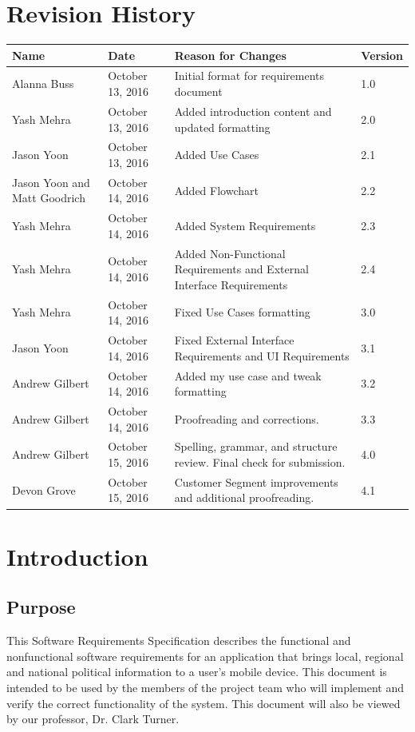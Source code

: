 \documentclass[12pt,oneside,letterpaper]{article}
\newcounter{use_case}
\newcounter{functional_requirement}
\begin{document}
\section*{Revision History}
\begin{tabu}{|X[L.5]|l|X|l|}
  \hline
  \textbf{Name}&\textbf{Date}&\textbf{Reason for Changes}&\textbf{Version} \\
  \hline
  Alanna Buss & October 13, 2016 & Initial format for requirements document & 1.0 \\
  \hline
  Yash Mehra & October 13, 2016 & Added introduction content and updated formatting & 2.0 \\
  \hline
  Jason Yoon & October 13, 2016 & Added Use Cases & 2.1 \\
  \hline
  Jason Yoon and Matt Goodrich & October 14, 2016 & Added Flowchart & 2.2 \\
  \hline
  Yash Mehra & October 14, 2016 & Added System Requirements & 2.3 \\
  \hline
  Yash Mehra & October 14, 2016 & Added Non-Functional Requirements and External Interface Requirements & 2.4 \\
  \hline
  Yash Mehra & October 14, 2016 & Fixed Use Cases formatting & 3.0 \\
  \hline
  Jason Yoon & October 14, 2016 & Fixed External Interface Requirements and UI Requirements& 3.1 \\
  \hline
  Andrew Gilbert & October 14, 2016 & Added my use case and tweak formatting & 3.2 \\
  \hline
  Andrew Gilbert & October 14, 2016 & Proofreading and corrections. & 3.3\\
  \hline
  Andrew Gilbert & October 15, 2016 & Spelling, grammar, and structure review. Final check for submission. & 4.0 \\
  \hline
  Devon Grove & October 15, 2016 & Customer Segment improvements and additional proofreading. & 4.1 \\
  \hline
\end{tabu}

\newpage

\section{Introduction}
\subsection{Purpose}
This Software Requirements Specification describes the functional and
nonfunctional software requirements for an application that brings
local, regional and national political information to a user's mobile
device.  This document is intended to be used by the members of the
project team who will implement and verify the correct functionality
of the system. This document will also be viewed by our professor,
Dr. Clark Turner.
\end{document}
